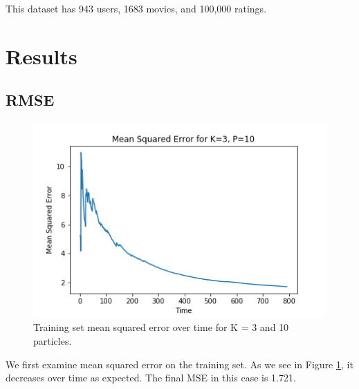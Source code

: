 \documentclass{article}
\begin{document}
This dataset has 943 users, 1683 movies, and 100,000 ratings.

\section{Results}

\subsection{RMSE}
\begin{figure}[ht]

\begin{center}
\centerline{\includegraphics[width=\columnwidth]{TrainMSE}}
\caption{Training set mean squared error over time for K = 3 and 10 particles.}
\label{TrainMSE}
\end{center}
\vskip -0.2in
\end{figure}

We first examine mean squared error on the training set. As we see in Figure \ref{TrainMSE}, it decreases
over time as expected. The final MSE in this case is 1.721.
\end{document}
